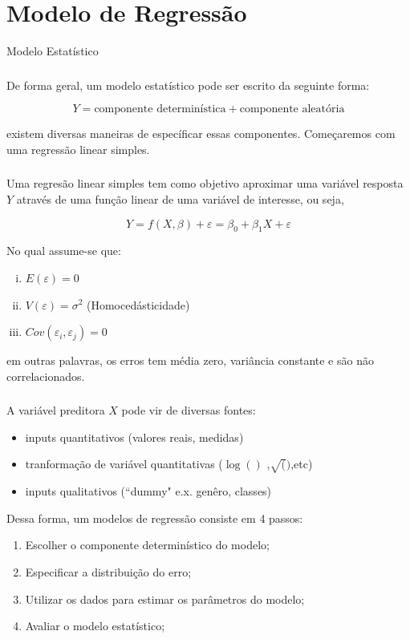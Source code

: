 \documentclass[14pt,aspectratio=1610]{beamer}
\begin{document}
\section{Modelo de Regressão}
\begin{frame}{Modelo Estatístico}
\frametitle{ }
\begin{block}{}
\justifying
De forma geral, um modelo estatístico pode ser escrito da seguinte forma:

$$Y=\textrm{componente determinística}+\textrm{componente aleatória}$$

existem diversas maneiras de específicar essas componentes. Começaremos com uma regressão linear simples.

\end{block}
\end{frame}


\begin{frame}{}
\frametitle{ }
\begin{block}{}
\justifying
Uma regresão linear simples tem como objetivo aproximar uma variável resposta $Y$ através de uma função linear de uma variável de interesse, ou seja,

$$Y=f(X,\beta)+\varepsilon=\beta_{0}+\beta_{1}X+\varepsilon$$

No qual assume-se que:

\begin{enumerate}[(i)]
\item $E(\varepsilon)=0$\pause
\item $V(\varepsilon)=\sigma^{2}$ (Homocedásticidade)\pause
\item $Cov(\varepsilon_{i},\varepsilon_{j})=0$
\end{enumerate}

em outras palavras, os erros tem média zero, variância constante e são não correlacionados.

\end{block}
\end{frame}

\begin{frame}{}
\frametitle{ }
\begin{block}{}
\justifying
A variável preditora $X$ pode vir de diversas fontes:
\begin{itemize}
\item inputs quantitativos (valores reais, medidas)
\item tranformação de variável quantitativas ($\log()$ ,$\sqrt()$,etc)
\item inputs qualitativos (``dummy" e.x. genêro, classes)
\end{itemize}
Dessa forma, um modelos de regressão consiste em 4 passos:
\begin{enumerate}
\item Escolher o componente determinístico do modelo;\pause
\item Especificar a distribuição do erro;\pause
\item Utilizar os dados para estimar os parâmetros do modelo;\pause
\item Avaliar o modelo estatístico;
\end{enumerate}
\end{block}
\end{frame}
\end{document}
